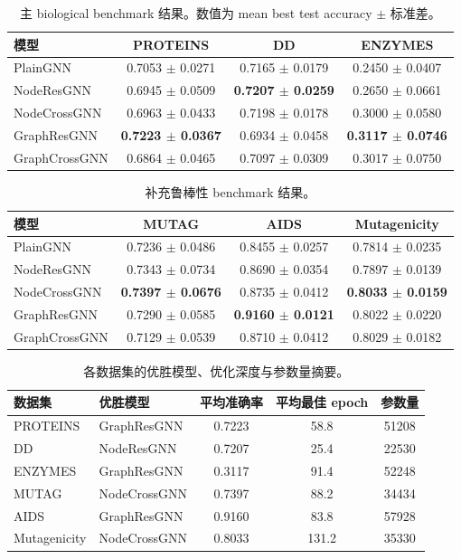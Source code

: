 \begin{table}[t]
\centering
\small
\caption{主 biological benchmark 结果。数值为 mean best test accuracy $\pm$ 标准差。}
\begin{tabular}{lccc}
\toprule
模型 & PROTEINS & DD & ENZYMES \\
\midrule
PlainGNN & 0.7053 $\pm$ 0.0271 & 0.7165 $\pm$ 0.0179 & 0.2450 $\pm$ 0.0407 \\
NodeResGNN & 0.6945 $\pm$ 0.0509 & \textbf{0.7207 $\pm$ 0.0259} & 0.2650 $\pm$ 0.0661 \\
NodeCrossGNN & 0.6963 $\pm$ 0.0433 & 0.7198 $\pm$ 0.0178 & 0.3000 $\pm$ 0.0580 \\
GraphResGNN & \textbf{0.7223 $\pm$ 0.0367} & 0.6934 $\pm$ 0.0458 & \textbf{0.3117 $\pm$ 0.0746} \\
GraphCrossGNN & 0.6864 $\pm$ 0.0465 & 0.7097 $\pm$ 0.0309 & 0.3017 $\pm$ 0.0750 \\
\bottomrule
\end{tabular}
\end{table}

\begin{table}[t]
\centering
\small
\caption{补充鲁棒性 benchmark 结果。}
\begin{tabular}{lccc}
\toprule
模型 & MUTAG & AIDS & Mutagenicity \\
\midrule
PlainGNN & 0.7236 $\pm$ 0.0486 & 0.8455 $\pm$ 0.0257 & 0.7814 $\pm$ 0.0235 \\
NodeResGNN & 0.7343 $\pm$ 0.0734 & 0.8690 $\pm$ 0.0354 & 0.7897 $\pm$ 0.0139 \\
NodeCrossGNN & \textbf{0.7397 $\pm$ 0.0676} & 0.8735 $\pm$ 0.0412 & \textbf{0.8033 $\pm$ 0.0159} \\
GraphResGNN & 0.7290 $\pm$ 0.0585 & \textbf{0.9160 $\pm$ 0.0121} & 0.8022 $\pm$ 0.0220 \\
GraphCrossGNN & 0.7129 $\pm$ 0.0539 & 0.8710 $\pm$ 0.0412 & 0.8029 $\pm$ 0.0182 \\
\bottomrule
\end{tabular}
\end{table}

\begin{table}[t]
\centering
\small
\caption{各数据集的优胜模型、优化深度与参数量摘要。}
\begin{tabular}{l l c c c}
\toprule
数据集 & 优胜模型 & 平均准确率 & 平均最佳 epoch & 参数量 \\
\midrule
PROTEINS & GraphResGNN & 0.7223 & 58.8 & 51208 \\
DD & NodeResGNN & 0.7207 & 25.4 & 22530 \\
ENZYMES & GraphResGNN & 0.3117 & 91.4 & 52248 \\
MUTAG & NodeCrossGNN & 0.7397 & 88.2 & 34434 \\
AIDS & GraphResGNN & 0.9160 & 83.8 & 57928 \\
Mutagenicity & NodeCrossGNN & 0.8033 & 131.2 & 35330 \\
\bottomrule
\end{tabular}
\end{table}
